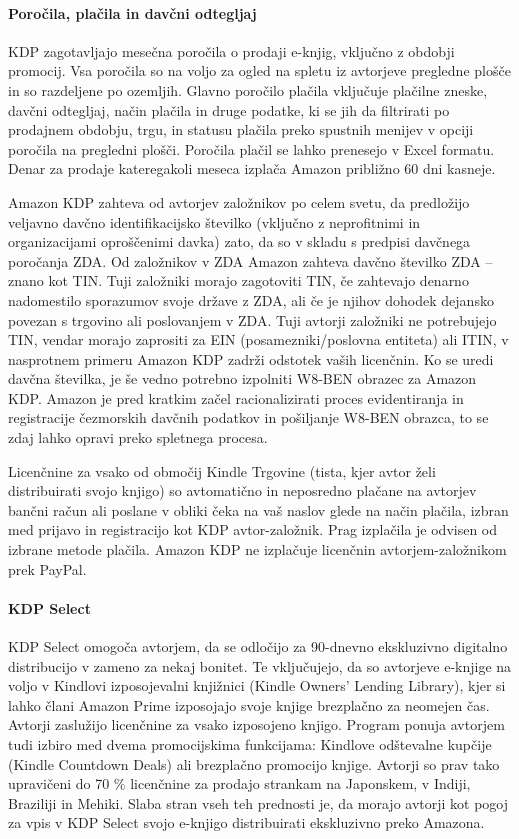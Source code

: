 \documentclass[a4paper, 12pt]{book}
\begin{document}
\paragraph{Poročila, plačila in davčni odtegljaj}
KDP zagotavljajo mesečna poročila o prodaji e-knjig, vključno z obdobji promocij. Vsa poročila so na voljo za ogled na spletu iz avtorjeve pregledne plošče in so razdeljene po ozemljih. Glavno poročilo plačila vključuje plačilne zneske, davčni odtegljaj, način plačila in druge podatke, ki se jih da filtrirati po prodajnem obdobju, trgu, in statusu plačila preko spustnih menijev v opciji poročila na pregledni plošči. Poročila plačil se lahko prenesejo v Excel formatu. Denar za prodaje kateregakoli meseca izplača Amazon približno 60 dni kasneje.

Amazon KDP zahteva od avtorjev založnikov po celem svetu, da predložijo veljavno davčno identifikacijsko številko (vključno z neprofitnimi in organizacijami oproščenimi davka) zato, da so v skladu s predpisi davčnega poročanja ZDA. Od založnikov v ZDA Amazon zahteva davčno številko ZDA – znano kot TIN. Tuji založniki morajo zagotoviti TIN, če zahtevajo denarno nadomestilo sporazumov svoje države z ZDA, ali če je njihov dohodek dejansko povezan s trgovino ali poslovanjem v ZDA. Tuji avtorji založniki ne potrebujejo TIN, vendar morajo zaprositi za EIN (posamezniki/poslovna entiteta) ali ITIN, v nasprotnem primeru Amazon KDP zadrži odstotek vaših licenčnin. Ko se uredi davčna številka, je še vedno potrebno izpolniti W8-BEN obrazec za Amazon KDP. Amazon je pred kratkim začel racionalizirati proces evidentiranja in registracije čezmorskih davčnih podatkov in pošiljanje W8-BEN obrazca, to se zdaj lahko opravi preko spletnega procesa. 

Licenčnine za vsako od območij Kindle Trgovine (tista, kjer avtor želi distribuirati svojo knjigo) so avtomatično in neposredno plačane na avtorjev bančni račun ali poslane v obliki čeka na vaš naslov glede na način plačila, izbran med prijavo in registracijo kot KDP avtor-založnik. Prag izplačila je odvisen od izbrane metode plačila. Amazon KDP ne izplačuje licenčnin avtorjem-založnikom prek PayPal. 

\paragraph{KDP Select}
KDP Select omogoča avtorjem, da se odločijo za 90-dnevno ekskluzivno digitalno distribucijo  v zameno za nekaj bonitet. Te vključujejo, da so avtorjeve e-knjige na voljo v Kindlovi izposojevalni knjižnici (Kindle Owners’ Lending Library), kjer si lahko člani Amazon Prime izposojajo svoje knjige brezplačno za neomejen čas. Avtorji zaslužijo licenčnine za vsako izposojeno knjigo. Program ponuja avtorjem tudi izbiro med dvema promocijskima funkcijama: Kindlove odštevalne kupčije (Kindle Countdown Deals) ali brezplačno promocijo knjige. Avtorji so prav tako upravičeni do 70 \% licenčnine za prodajo strankam na Japonskem, v Indiji, Braziliji in Mehiki. Slaba stran  vseh teh prednosti je, da morajo avtorji kot pogoj za vpis v KDP Select svojo e-knjigo distribuirati ekskluzivno preko Amazona.
\end{document}
